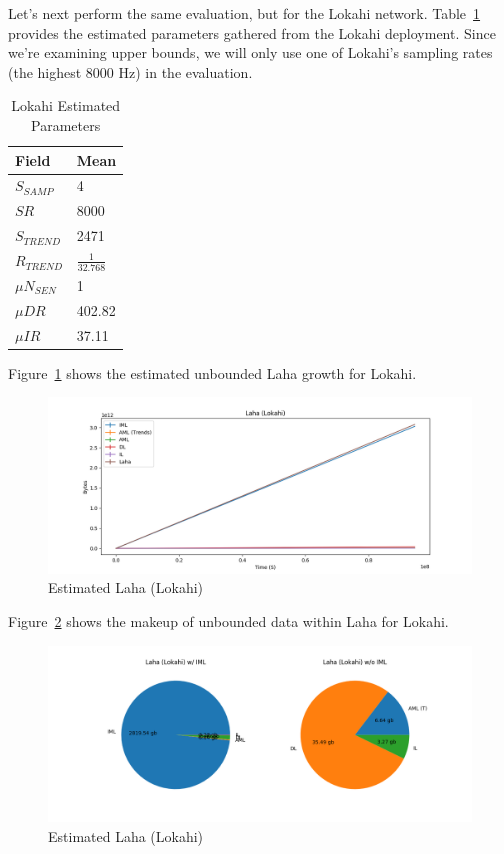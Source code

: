 Let's next perform the same evaluation, but for the Lokahi network. Table~\ref{table:estimated_laha_lokahi} provides the estimated parameters gathered from the Lokahi deployment. Since we're examining upper bounds, we will only use one of Lokahi's sampling rates (the highest 8000 Hz) in the evaluation.

\begin{table}[H]
	\centering
	\caption{Lokahi Estimated Parameters}
	\begin{tabularx}{\textwidth}{ll}
		\toprule
		\textbf{Field} & \textbf{Mean} \\
		\midrule
		$S_{SAMP}$ & 4 \\
		$SR$ & 8000 \\
		$S_{TREND}$ & 2471  \\
		$R_{TREND}$ & $\frac{1}{32.768}$  \\
		$\mu N_{SEN}$ & 1  \\
		$\mu DR$ & 402.82  \\
		$\mu IR$ & 37.11 \\
		\bottomrule
	\end{tabularx}
	\label{table:estimated_laha_lokahi}
\end{table}

Figure~\ref{fig:plot_lala_lokahi} shows the estimated unbounded Laha growth for Lokahi.

\begin{figure}[H]
	\centering
	\includegraphics[width=\linewidth]{figures/plot_laha_lokahi.png}
	\caption{Estimated Laha (Lokahi)}
	\label{fig:plot_lala_lokahi}
\end{figure}

Figure~\ref{fig:plot_lala_lokahi_pie} shows the makeup of unbounded data within Laha for Lokahi.

\begin{figure}[H]
	\centering
	\includegraphics[width=\linewidth]{figures/plot_laha_lokahi_pie.png}
	\caption{Estimated Laha (Lokahi)}
	\label{fig:plot_lala_lokahi_pie}
\end{figure}

